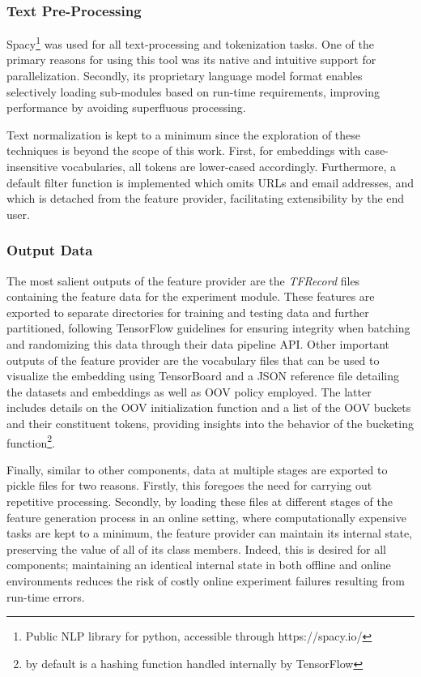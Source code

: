 \documentclass[12pt, a4paper]{report}
\theoremstyle{definition}
\theoremstyle{definition}%
\theoremstyle{definition}%
\theoremstyle{definition}%
\theoremstyle{definition}%
\theoremstyle{definition}%
\begin{document}
\subsubsection{Text Pre-Processing}
Spacy\footnote{Public NLP library for python, accessible through https://spacy.io/} was used for all text-processing and tokenization tasks. One of the primary reasons for using this tool was its native and intuitive support for parallelization. Secondly, its proprietary language model format enables selectively loading sub-modules based on run-time requirements, improving performance by avoiding superfluous processing. 

Text normalization is kept to a minimum since the exploration of these techniques is beyond the scope of this work. First, for embeddings with case-insensitive vocabularies, all tokens are lower-cased accordingly. Furthermore, a default filter function is implemented which omits URLs and email addresses, and which is detached from the feature provider, facilitating extensibility by the end user.

\subsubsection{Output Data}
The most salient outputs of the feature provider are the \textit{TFRecord} files containing the feature data for the experiment module. These features are exported to separate directories for training and testing data and further partitioned, following TensorFlow guidelines for ensuring integrity when batching and randomizing this data through their data pipeline API. Other important outputs of the feature provider are the vocabulary files that can be used to visualize the embedding using TensorBoard and a JSON reference file detailing the datasets and embeddings as well as OOV policy employed. The latter includes details on the OOV initialization function and a list of the OOV buckets and their constituent tokens, providing insights into the behavior of the bucketing function\footnote{by default is a hashing function handled internally by TensorFlow}.

Finally, similar to other components, data at multiple stages are exported to pickle files for two reasons. Firstly, this foregoes the need for carrying out repetitive processing. Secondly, by loading these files at different stages of the feature generation process in an online setting, where computationally expensive tasks are kept to a minimum, the feature provider can maintain its internal state, preserving the value of all of its class members. Indeed, this is desired for all components; maintaining an identical internal state in both offline and online environments reduces the risk of costly online experiment failures resulting from run-time errors.
\end{document}
